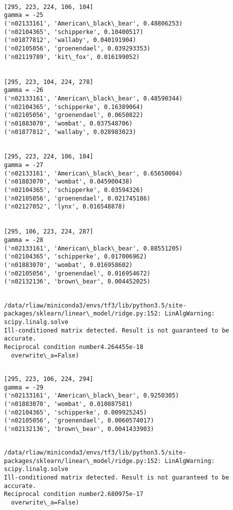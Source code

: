 \documentclass[11pt]{article}
\begin{document}
    \begin{Verbatim}[commandchars=\\\{\}]

[295, 223, 224, 106, 104]
gamma = -25
('n02133161', 'American\_black\_bear', 0.48806253)
('n02104365', 'schipperke', 0.10400517)
('n01877812', 'wallaby', 0.040191904)
('n02105056', 'groenendael', 0.039293353)
('n02119789', 'kit\_fox', 0.016199052)


[295, 223, 104, 224, 278]
gamma = -26
('n02133161', 'American\_black\_bear', 0.48590344)
('n02104365', 'schipperke', 0.16389064)
('n02105056', 'groenendael', 0.0650822)
('n01883070', 'wombat', 0.037548706)
('n01877812', 'wallaby', 0.028983023)


[295, 223, 224, 106, 104]
gamma = -27
('n02133161', 'American\_black\_bear', 0.65650004)
('n01883070', 'wombat', 0.045900438)
('n02104365', 'schipperke', 0.03594326)
('n02105056', 'groenendael', 0.021745186)
('n02127052', 'lynx', 0.016548878)


[295, 106, 223, 224, 287]
gamma = -28
('n02133161', 'American\_black\_bear', 0.88551205)
('n02104365', 'schipperke', 0.017006962)
('n01883070', 'wombat', 0.016958602)
('n02105056', 'groenendael', 0.016954672)
('n02132136', 'brown\_bear', 0.004452025)


    \end{Verbatim}

    \begin{Verbatim}[commandchars=\\\{\}]
/data/rliaw/miniconda3/envs/tf3/lib/python3.5/site-packages/sklearn/linear\_model/ridge.py:152: LinAlgWarning: scipy.linalg.solve
Ill-conditioned matrix detected. Result is not guaranteed to be accurate.
Reciprocal condition number4.264455e-18
  overwrite\_a=False)

    \end{Verbatim}

    \begin{Verbatim}[commandchars=\\\{\}]

[295, 223, 106, 224, 294]
gamma = -29
('n02133161', 'American\_black\_bear', 0.9250305)
('n01883070', 'wombat', 0.010887581)
('n02104365', 'schipperke', 0.009925245)
('n02105056', 'groenendael', 0.0060574017)
('n02132136', 'brown\_bear', 0.0041433903)


    \end{Verbatim}

    \begin{Verbatim}[commandchars=\\\{\}]
/data/rliaw/miniconda3/envs/tf3/lib/python3.5/site-packages/sklearn/linear\_model/ridge.py:152: LinAlgWarning: scipy.linalg.solve
Ill-conditioned matrix detected. Result is not guaranteed to be accurate.
Reciprocal condition number2.680975e-17
  overwrite\_a=False)

    \end{Verbatim}
\end{document}
